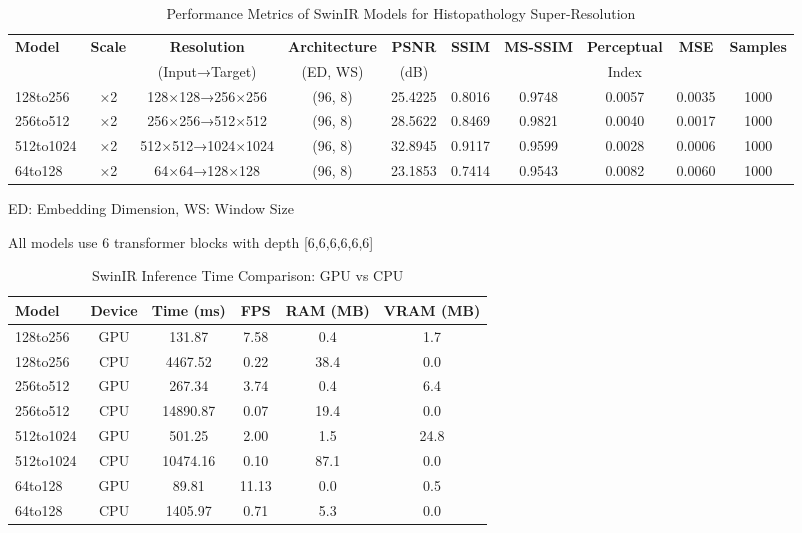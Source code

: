 
\begin{table*}[htbp]
\centering
\caption{Performance Metrics of SwinIR Models for Histopathology Super-Resolution}
\label{tab:swinir_metrics}
\begin{tabular}{|l|c|c|c|c|c|c|c|c|c|}
\hline
\textbf{Model} & \textbf{Scale} & \textbf{Resolution} & \textbf{Architecture} & \textbf{PSNR} & \textbf{SSIM} & \textbf{MS-SSIM} & \textbf{Perceptual} & \textbf{MSE} & \textbf{Samples} \\
& & (Input→Target) & (ED, WS) & (dB) & & & Index & & \\
\hline
128to256 & ×2 & 128×128→256×256 & (96, 8) & 25.4225 & 0.8016 & 0.9748 & 0.0057 & 0.0035 & 1000 \\
256to512 & ×2 & 256×256→512×512 & (96, 8) & 28.5622 & 0.8469 & 0.9821 & 0.0040 & 0.0017 & 1000 \\
512to1024 & ×2 & 512×512→1024×1024 & (96, 8) & 32.8945 & 0.9117 & 0.9599 & 0.0028 & 0.0006 & 1000 \\
64to128 & ×2 & 64×64→128×128 & (96, 8) & 23.1853 & 0.7414 & 0.9543 & 0.0082 & 0.0060 & 1000 \\
\hline
\end{tabular}
\begin{tablenotes}
\item ED: Embedding Dimension, WS: Window Size
\item All models use 6 transformer blocks with depth [6,6,6,6,6,6]
\end{tablenotes}
\end{table*}


\begin{table}[htbp]
\centering
\caption{SwinIR Inference Time Comparison: GPU vs CPU}
\label{tab:swinir_timing}
\begin{tabular}{|l|c|c|c|c|c|}
\hline
\textbf{Model} & \textbf{Device} & \textbf{Time (ms)} & \textbf{FPS} & \textbf{RAM (MB)} & \textbf{VRAM (MB)} \\
\hline
128to256 & GPU & 131.87 & 7.58 & 0.4 & 1.7 \\
128to256 & CPU & 4467.52 & 0.22 & 38.4 & 0.0 \\
256to512 & GPU & 267.34 & 3.74 & 0.4 & 6.4 \\
256to512 & CPU & 14890.87 & 0.07 & 19.4 & 0.0 \\
512to1024 & GPU & 501.25 & 2.00 & 1.5 & 24.8 \\
512to1024 & CPU & 10474.16 & 0.10 & 87.1 & 0.0 \\
64to128 & GPU & 89.81 & 11.13 & 0.0 & 0.5 \\
64to128 & CPU & 1405.97 & 0.71 & 5.3 & 0.0 \\
\hline
\end{tabular}
\end{table}
